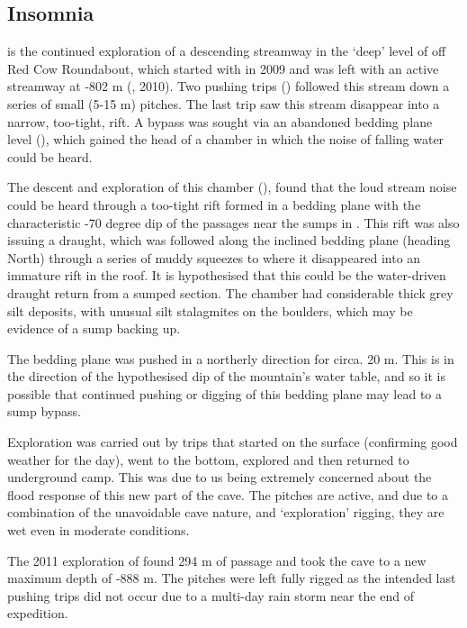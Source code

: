 \subsection{Insomnia}

 is the continued exploration of a descending streamway
in the `deep' level of  off Red Cow Roundabout, which
started with  in 2009 and was left with an active
streamway at -802 m (, 2010). Two pushing trips
() followed this stream down a series of small (5-15
m) pitches. The last trip saw this stream disappear into a narrow,
too-tight, rift. A bypass was sought via an abandoned bedding plane
level (), which gained the head of a chamber in which the
noise of falling water could be heard.

The descent and exploration of this chamber (), found that
the loud stream noise could be heard through a too-tight rift formed in
a bedding plane with the characteristic -70 degree dip of the passages
near the sumps in . This rift was also issuing a draught, which
was followed along the inclined bedding plane (heading North) through a
series of muddy squeezes to where it disappeared into an immature rift
in the roof. It is hypothesised that this could be the water-driven
draught return from a sumped section. The chamber had considerable thick
grey silt deposits, with unusual silt stalagmites on the boulders, which
may be evidence of a sump backing up.

The bedding plane was pushed in a northerly direction for circa. 20 m.
This is in the direction of the hypothesised dip of the mountain's water
table, and so it is possible that continued pushing or digging of this
bedding plane may lead to a sump bypass.

Exploration was carried out by trips that started on the surface
(confirming good weather for the day), went to the bottom, explored and
then returned to underground camp. This was due to us being extremely
concerned about the flood response of this new part of the cave. The
pitches are active, and due to a combination of the unavoidable cave
nature, and `exploration' rigging, they are wet even in moderate
conditions.

The 2011 exploration of  found 294 m of passage and took
the cave to a new maximum depth of -888 m. The pitches were left fully
rigged as the intended last pushing trips did not occur due to a
multi-day rain storm near the end of expedition.


